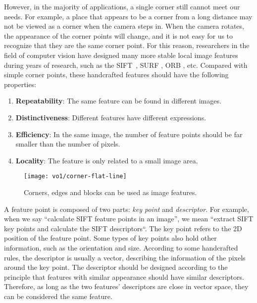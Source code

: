 However, in the majority of applications, a single corner still cannot meet our needs. For example, a place that appears to be a corner from a long distance may not be viewed as a corner when the camera steps in. When the camera rotates, the appearance of the corner points will change, and it is not easy for us to recognize that they are the same corner point. For this reason, researchers in the field of computer vision have designed many more stable local image features during years of research, such as the SIFT~\cite{Lowe2004}, SURF {\cite{Bay2006}} , ORB {\cite{Rublee2011}}, etc. Compared with simple corner points, these handcrafted features should have the following properties:

\begin{enumerate}
\item \textbf{Repeatability}: The same feature can be found in different images.
\item \textbf{Distinctiveness}: Different features have different expressions.
\item \textbf{Efficiency}: In the same image, the number of feature points should be far smaller than the number of pixels.
\item \textbf{Locality}: The feature is only related to a small image area.
\end{enumerate}

\begin{figure}[!ht]
    \centering
    \texttt{[image: vo1/corner-flat-line]}
    \caption{Corners, edges and blocks can be used as image features.}
    \label{fig:corner-feature}
\end{figure}

A feature point is composed of two parts: \textit{key point} and \textit{descriptor}. For example, when we say ``calculate SIFT feature points in an image'', we mean ``extract SIFT key points and calculate the SIFT descriptors``. The key point refers to the 2D position of the feature point. Some types of key points also hold other information, such as the orientation and size. According to some handcrafted rules, the descriptor is usually a vector, describing the information of the pixels around the key point. The descriptor should be designed according to the principle that features with similar appearance should have similar descriptors. Therefore, as long as the two features' descriptors are close in vector space, they can be considered the same feature. 

